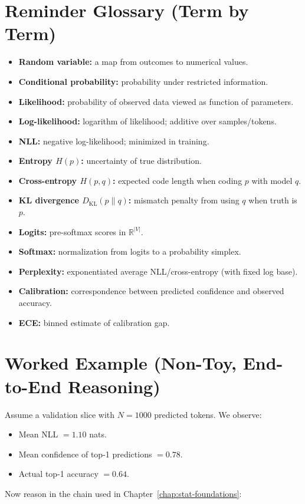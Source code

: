 \section*{Reminder Glossary (Term by Term)}
\begin{itemize}[leftmargin=1.5em]
  \item \textbf{Random variable:} a map from outcomes to numerical values.
  \item \textbf{Conditional probability:} probability under restricted information.
  \item \textbf{Likelihood:} probability of observed data viewed as function of parameters.
  \item \textbf{Log-likelihood:} logarithm of likelihood; additive over samples/tokens.
  \item \textbf{NLL:} negative log-likelihood; minimized in training.
  \item \textbf{Entropy $H(p)$:} uncertainty of true distribution.
  \item \textbf{Cross-entropy $H(p,q)$:} expected code length when coding $p$ with model $q$.
  \item \textbf{KL divergence $D_{\mathrm{KL}}(p\|q)$:} mismatch penalty from using $q$ when truth is $p$.
  \item \textbf{Logits:} pre-softmax scores in $\mathbb{R}^{|V|}$.
  \item \textbf{Softmax:} normalization from logits to a probability simplex.
  \item \textbf{Perplexity:} exponentiated average NLL/cross-entropy (with fixed log base).
  \item \textbf{Calibration:} correspondence between predicted confidence and observed accuracy.
  \item \textbf{ECE:} binned estimate of calibration gap.
\end{itemize}

\section*{Worked Example (Non-Toy, End-to-End Reasoning)}
Assume a validation slice with $N=1000$ predicted tokens. We observe:
\begin{itemize}[leftmargin=1.5em]
  \item Mean NLL $=1.10$ nats.
  \item Mean confidence of top-1 predictions $=0.78$.
  \item Actual top-1 accuracy $=0.64$.
\end{itemize}
Now reason in the chain used in Chapter~\ref{chap:stat-foundations}:

